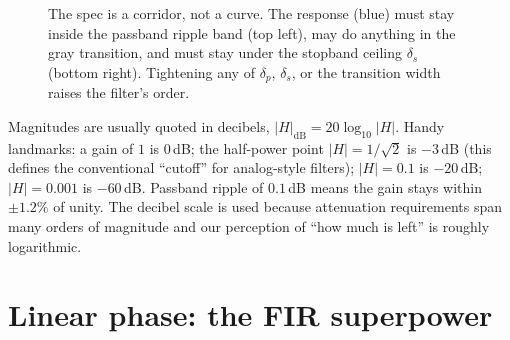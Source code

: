 \begin{figure}[H]
\centering
{}
\caption{The spec is a corridor, not a curve. The response (blue) must stay inside
the passband ripple band (top left), may do anything in the gray transition, and
must stay under the stopband ceiling $\delta_s$ (bottom right). Tightening any of
$\delta_p$, $\delta_s$, or the transition width raises the filter's order.}
\label{ch16:fig-spec}
\end{figure}

\begin{formalbox}
Magnitudes are usually quoted in decibels, $|H|_{\text{dB}} = 20\log_{10}|H|$.
Handy landmarks: a gain of $1$ is $0$\,dB; the half-power point $|H| = 1/\sqrt2$ is
$-3$\,dB (this defines the conventional ``cutoff'' for analog-style filters);
$|H| = 0.1$ is $-20$\,dB; $|H| = 0.001$ is $-60$\,dB. Passband ripple of
$0.1$\,dB means the gain stays within $\pm 1.2\%$ of unity. The decibel scale is
used because attenuation requirements span many orders of magnitude and our
perception of ``how much is left'' is roughly logarithmic.
\end{formalbox}

\section{Linear phase: the FIR superpower}
\label{ch16:linphase}

